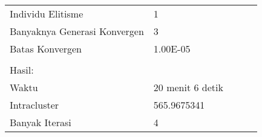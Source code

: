 \begin{table}[H]
\begin{tabular}{lllll}
\multicolumn{1}{|l|}{Individu Elitisme}            & \multicolumn{1}{l|}{1}                                         &                                                       &                                                        &                                                       \\ \cline{1-2}
\multicolumn{1}{|l|}{Banyaknya Generasi Konvergen} & \multicolumn{1}{l|}{3}                                         &                                                       &                                                        &                                                       \\ \cline{1-2}
\multicolumn{1}{|l|}{Batas Konvergen}              & \multicolumn{1}{l|}{1.00E-05}                                  &                                                       &                                                        &                                                       \\ \cline{1-2}
                                                   &                                                                &                                                       &                                                        &                                                       \\
Hasil:                                             &                                                                &                                                       &                                                        &                                                       \\ \cline{1-2}
\multicolumn{1}{|l|}{Waktu}                        & \multicolumn{1}{l|}{20 menit 6 detik}                          &                                                       &                                                        &                                                       \\ \cline{1-2}
\multicolumn{1}{|l|}{Intracluster}                 & \multicolumn{1}{l|}{565.9675341}                               &                                                       &                                                        &                                                       \\ \cline{1-2}
\multicolumn{1}{|l|}{Banyak Iterasi}               & \multicolumn{1}{l|}{4}                                         &                                                       &                                                        &                                                       \\ \cline{1-2}

\end{tabular}
\end{table}
